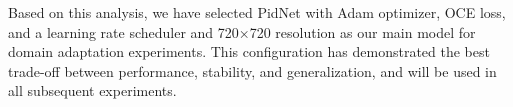 \documentclass[10pt,twocolumn,letterpaper]{article}
\begin{document}
Based on this analysis, we have selected PidNet with Adam optimizer, OCE loss, and a learning rate scheduler and 720×720 resolution as our main model for domain adaptation experiments. This configuration has demonstrated the best trade-off between performance, stability, and generalization, and will be used in all subsequent experiments.


\noindent

\begin{table}[t]
\centering
{}
\caption{Performance of PIDNet with Adversarial Learning and DACS}
\end{table}
\end{document}
